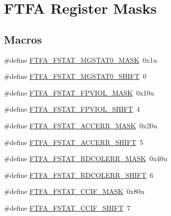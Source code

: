 \hypertarget{group___f_t_f_a___register___masks}{}\section{F\+T\+FA Register Masks}
\label{group___f_t_f_a___register___masks}
\subsection*{Macros}
\begin{DoxyCompactItemize}
\item 
\#define \hyperlink{group___f_t_f_a___register___masks_ga56163f418850b05a9fb528e94bbc026e}{F\+T\+F\+A\+\_\+\+F\+S\+T\+A\+T\+\_\+\+M\+G\+S\+T\+A\+T0\+\_\+\+M\+A\+SK}~0x1u
\item 
\#define \hyperlink{group___f_t_f_a___register___masks_ga61b25328b4e91259c518051ad485c9e1}{F\+T\+F\+A\+\_\+\+F\+S\+T\+A\+T\+\_\+\+M\+G\+S\+T\+A\+T0\+\_\+\+S\+H\+I\+FT}~0
\item 
\#define \hyperlink{group___f_t_f_a___register___masks_ga371bc7284b6d2e14f852e4e7e0316fef}{F\+T\+F\+A\+\_\+\+F\+S\+T\+A\+T\+\_\+\+F\+P\+V\+I\+O\+L\+\_\+\+M\+A\+SK}~0x10u
\item 
\#define \hyperlink{group___f_t_f_a___register___masks_ga92718795ccbab208784ed798d252567e}{F\+T\+F\+A\+\_\+\+F\+S\+T\+A\+T\+\_\+\+F\+P\+V\+I\+O\+L\+\_\+\+S\+H\+I\+FT}~4
\item 
\#define \hyperlink{group___f_t_f_a___register___masks_gaf7824945e3224ae270302e23286e9e34}{F\+T\+F\+A\+\_\+\+F\+S\+T\+A\+T\+\_\+\+A\+C\+C\+E\+R\+R\+\_\+\+M\+A\+SK}~0x20u
\item 
\#define \hyperlink{group___f_t_f_a___register___masks_ga3bbe94d5c4203cd6eebe9e0e78f555aa}{F\+T\+F\+A\+\_\+\+F\+S\+T\+A\+T\+\_\+\+A\+C\+C\+E\+R\+R\+\_\+\+S\+H\+I\+FT}~5
\item 
\#define \hyperlink{group___f_t_f_a___register___masks_ga96b65895e79e6256e4312d5677dd8ae2}{F\+T\+F\+A\+\_\+\+F\+S\+T\+A\+T\+\_\+\+R\+D\+C\+O\+L\+E\+R\+R\+\_\+\+M\+A\+SK}~0x40u
\item 
\#define \hyperlink{group___f_t_f_a___register___masks_ga4d4481b6c7d09a3bd6969cdf66a00d75}{F\+T\+F\+A\+\_\+\+F\+S\+T\+A\+T\+\_\+\+R\+D\+C\+O\+L\+E\+R\+R\+\_\+\+S\+H\+I\+FT}~6
\item 
\#define \hyperlink{group___f_t_f_a___register___masks_ga7c3a9f7d0c5882721425d4c46b27a24d}{F\+T\+F\+A\+\_\+\+F\+S\+T\+A\+T\+\_\+\+C\+C\+I\+F\+\_\+\+M\+A\+SK}~0x80u
\item 
\#define \hyperlink{group___f_t_f_a___register___masks_ga14a29b83c4f1b2e67a066799a46863f6}{F\+T\+F\+A\+\_\+\+F\+S\+T\+A\+T\+\_\+\+C\+C\+I\+F\+\_\+\+S\+H\+I\+FT}~7

\end{DoxyCompactItemize}
